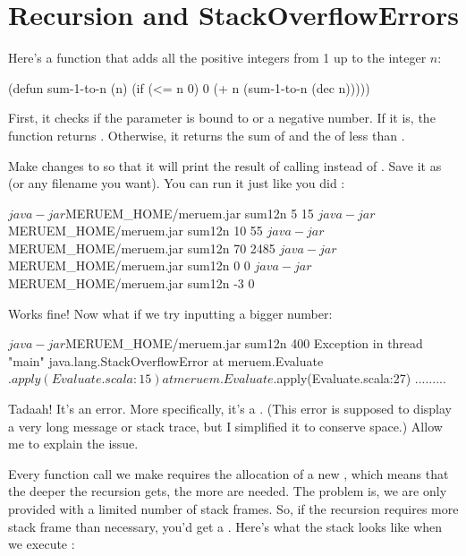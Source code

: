 \section{Recursion and StackOverflowErrors}

Here's a function that adds all the positive integers from 1 up to the integer $n$: 

\begin{Meruem}
(defun sum-1-to-n (n)
  (if (<= n 0)
    0    
    (+ n (sum-1-to-n (dec n)))))
\end{Meruem}

First, it checks if the parameter is bound to  or a negative number. If it is, the function returns . Otherwise, it returns the sum of  and the  of  less than . 

Make changes to  so that it will print the result of calling  instead of .  Save it as  (or any filename you want). You can run it just like you did :

\begin{REPL}
$ java -jar $MERUEM_HOME/meruem.jar sum12n 5
15
$ java -jar $MERUEM_HOME/meruem.jar sum12n 10
55
$ java -jar $MERUEM_HOME/meruem.jar sum12n 70
2485
$ java -jar $MERUEM_HOME/meruem.jar sum12n 0
0
$ java -jar $MERUEM_HOME/meruem.jar sum12n -3
0
\end{REPL}

Works fine! Now what if we try inputting a bigger number:

\begin{REPL}
$ java -jar $MERUEM_HOME/meruem.jar sum12n 400
Exception in thread "main" java.lang.StackOverflowError
	at meruem.Evaluate$.apply(Evaluate.scala:15)
	at meruem.Evaluate$.apply(Evaluate.scala:27)
.........
\end{REPL}

Tadaah! It's an error. More specifically, it's a . (This error is supposed to display a very long message or stack trace, but I simplified it to conserve space.) Allow me to explain the issue. 

Every function call we make requires the allocation of a new , which means that the deeper the recursion gets, the more  are needed. The problem is, we are only provided with a limited number of stack frames. So, if the recursion requires more stack frame than necessary, you'd get a . Here's what the stack looks like when we execute :

